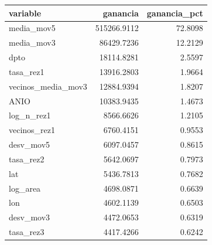 \begin{tabular}{lrr}
\toprule
variable & ganancia & ganancia\_pct \\
\midrule
media\_mov5 & 515266.9112 & 72.8098 \\
media\_mov3 & 86429.7236 & 12.2129 \\
dpto & 18114.8281 & 2.5597 \\
tasa\_rez1 & 13916.2803 & 1.9664 \\
vecinos\_media\_mov3 & 12884.9394 & 1.8207 \\
ANIO & 10383.9435 & 1.4673 \\
log\_n\_rez1 & 8566.6626 & 1.2105 \\
vecinos\_rez1 & 6760.4151 & 0.9553 \\
desv\_mov5 & 6097.0457 & 0.8615 \\
tasa\_rez2 & 5642.0697 & 0.7973 \\
lat & 5436.7813 & 0.7682 \\
log\_area & 4698.0871 & 0.6639 \\
lon & 4602.1139 & 0.6503 \\
desv\_mov3 & 4472.0653 & 0.6319 \\
tasa\_rez3 & 4417.4266 & 0.6242 \\
\bottomrule
\end{tabular}
